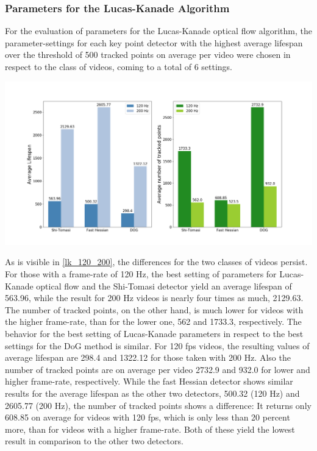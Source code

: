 \documentclass[Bachelorarbeit.tex]{subfiles}
\begin{document}
\subsubsection{Parameters for the Lucas-Kanade Algorithm}
For the evaluation of parameters for the Lucas-Kanade optical flow algorithm, the parameter-settings for each key point detector with the highest average lifespan over the threshold of 500 tracked points on average per video were chosen in respect to the class of videos, coming to a total of 6 settings. 

\begin{center}
	\includegraphics[width=1.1\linewidth]{Images/values_lk}
	\label{lk_120_200}
\end{center}

As is visible in \autoref{lk_120_200}, the differences for the two classes of videos persist. For those with a frame-rate of 120 Hz, the best setting of parameters for Lucas-Kanade optical flow and the Shi-Tomasi detector yield an average lifespan of 563.96, while the result for 200 Hz videos is nearly four times as much, 2129.63. The number of tracked points, on the other hand, is much lower for videos with the higher frame-rate, than for the lower one, 562 and 1733.3, respectively. The behavior for the best setting of Lucas-Kanade parameters in respect to the best settings for the DoG method is similar. For 120 fps videos, the resulting values of average lifespan are 298.4 and 1322.12 for those taken with 200 Hz. Also the number of tracked points are on average per video 2732.9 and 932.0 for lower and higher frame-rate, respectively. While the fast Hessian detector shows similar results for the average lifespan as the other two detectors, 500.32 (120 Hz) and 2605.77 (200 Hz), the number of tracked points shows a difference: It returns only 608.85 on average for videos with 120 fps, which is only less than 20 percent more, than for videos with a higher frame-rate. Both of these yield the lowest result in comparison to the other two detectors.\\
\end{document}
